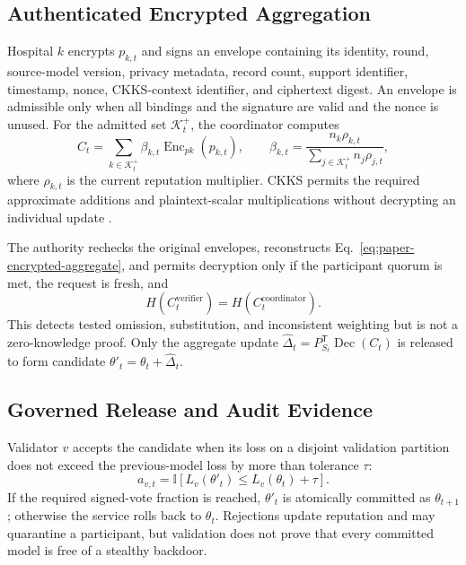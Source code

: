 \documentclass[conference]{IEEEtran}
\begin{document}
\subsection{Authenticated Encrypted Aggregation}

Hospital $k$ encrypts $p_{k,t}$ and signs an envelope containing its identity,
round, source-model version, privacy metadata, record count, support identifier,
timestamp, nonce, CKKS-context identifier, and ciphertext digest. An envelope is
admissible only when all bindings and the signature are valid and the nonce is
unused. For the admitted set $\mathcal{K}_t^+$, the coordinator computes
\begin{equation}
C_t=\sum_{k\in\mathcal{K}_t^+}\beta_{k,t}
\operatorname{Enc}_{pk}(p_{k,t}),\qquad
\beta_{k,t}=\frac{n_k\rho_{k,t}}
{\sum_{j\in\mathcal{K}_t^+}n_j\rho_{j,t}},
\label{eq:paper-encrypted-aggregate}
\end{equation}
where $\rho_{k,t}$ is the current reputation multiplier. CKKS permits the
required approximate additions and plaintext-scalar multiplications without
decrypting an individual update \cite{cheon2017homomorphic}.

The authority rechecks the original envelopes, reconstructs
Eq.~\eqref{eq:paper-encrypted-aggregate}, and permits decryption only if the
participant quorum is met, the request is fresh, and
\begin{equation}
H(C_t^{\mathrm{verifier}})=H(C_t^{\mathrm{coordinator}}).
\label{eq:paper-aggregate-verification}
\end{equation}
This detects tested omission, substitution, and inconsistent weighting but is
not a zero-knowledge proof. Only the aggregate update
$\widehat{\Delta}_t=P_{S_t}^{\mathsf T}\operatorname{Dec}(C_t)$ is released to
form candidate $\theta'_t=\theta_t+\widehat{\Delta}_t$.

\subsection{Governed Release and Audit Evidence}

Validator $v$ accepts the candidate when its loss on a disjoint validation
partition does not exceed the previous-model loss by more than tolerance $\tau$:
\begin{equation}
a_{v,t}=\mathbb{I}\!\left[
L_v(\theta'_t)\leq L_v(\theta_t)+\tau\right].
\label{eq:paper-validation}
\end{equation}
If the required signed-vote fraction is reached, $\theta'_t$ is atomically
committed as $\theta_{t+1}$; otherwise the service rolls back to $\theta_t$.
Rejections update reputation and may quarantine a participant, but validation
does not prove that every committed model is free of a stealthy backdoor.
\end{document}
